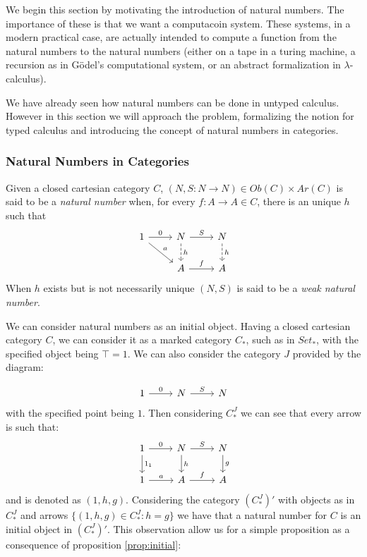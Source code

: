 We begin this section by motivating the introduction of natural numbers. The importance of these is that we want a computacoin system. These systems, in a modern practical case, are actually intended to compute a function from the natural numbers to the natural numbers (either on a tape in a turing machine, a recursion as in Gödel's computational system, or an abstract formalization in $\lambda$-calculus).

We have already seen how natural numbers can be done in untyped calculus. However in this section we will approach the problem, formalizing the notion for typed calculus and introducing the concept of natural numbers in categories.

\subsubsection{Natural Numbers in Categories}


\begin{definition}
  Given a closed cartesian category $C$,  $(N,S:N\to N)\in Ob(C)\times Ar(C)$ is said to be a \emph{natural number} when, for every $f:A\to A\in C$, there is an unique $h$ such that
\[
  \begin{tikzcd}
    1\arrow{dr}{a}\arrow{r}{0} & N\arrow{r}{S}\arrow[dashed]{d}{h} & N\arrow[dashed]{d}{h}\\
    & A\arrow{r}{f} & A
  \end{tikzcd}
\]
When $h$ exists but is not necessarily unique $(N,S)$ is said to be a \emph{weak natural number}.
\end{definition}

We can consider natural numbers as an initial object. Having a closed cartesian category $C$, we can consider it as a marked category $C_*$, such as in $Set_*$, with the specified object being $\top =1$. We can also consider the category $J$ provided by the diagram:

\[
  \begin{tikzcd}
    1\arrow{r}{0} & N\arrow{r}{S} & N
  \end{tikzcd}
\]
with the specified point being $1$. Then considering $C_*^J$ we can see that every arrow is such that: 
\[
  \begin{tikzcd}
    1\arrow{r}{0}\arrow{d}{1_1} & N\arrow{r}{S}\arrow{d}{h} & N\arrow{d}{g}\\
    1\arrow{r}{a} & A\arrow{r}{f} & A
  \end{tikzcd}
\]
and is denoted as $(1,h,g)$. Considering the category $(C_*^J)'$ with objects as in $C_*^J$ and arrows  $\{(1,h,g)\in C_*^J: h=g\}$ we have that a natural number for $C$ is an initial object in $(C_*^J)'$. This observation allow us for a simple proposition as a consequence of proposition \ref{prop:initial}:

